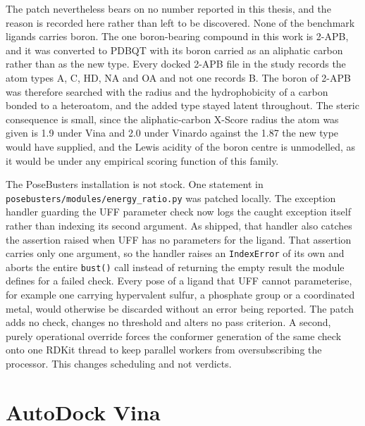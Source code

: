 The patch nevertheless bears on no number reported in this thesis, and the reason is recorded here rather than left to be discovered. None of the benchmark ligands carries boron. The one boron-bearing compound in this work is 2-APB, and it was converted to PDBQT with its boron carried as an aliphatic carbon rather than as the new type. Every docked 2-APB file in the study records the atom types A, C, HD, NA and OA and not one records B. The boron of 2-APB was therefore searched with the radius and the hydrophobicity of a carbon bonded to a heteroatom, and the added type stayed latent throughout. The steric consequence is small, since the aliphatic-carbon X-Score radius the atom was given is 1.9\angstrom{} under Vina and 2.0\angstrom{} under Vinardo against the 1.87\angstrom{} the new type would have supplied, and the Lewis acidity of the boron centre is unmodelled, as it would be under any empirical scoring function of this family.

The PoseBusters installation is not stock. One statement in \texttt{posebusters/modules/energy\_ratio.py} was patched locally. The exception handler guarding the UFF parameter check now logs the caught exception itself rather than indexing its second argument. As shipped, that handler also catches the assertion raised when UFF has no parameters for the ligand. That assertion carries only one argument, so the handler raises an \texttt{IndexError} of its own and aborts the entire \texttt{bust()} call instead of returning the empty result the module defines for a failed check. Every pose of a ligand that UFF cannot parameterise, for example one carrying hypervalent sulfur, a phosphate group or a coordinated metal, would otherwise be discarded without an error being reported. The patch adds no check, changes no threshold and alters no pass criterion. A second, purely operational override forces the conformer generation of the same check onto one RDKit thread to keep parallel workers from oversubscribing the processor. This changes scheduling and not verdicts.

\hypertarget{autodock-vina-2}{%
\section{AutoDock Vina}\label{autodock-vina-2}}


